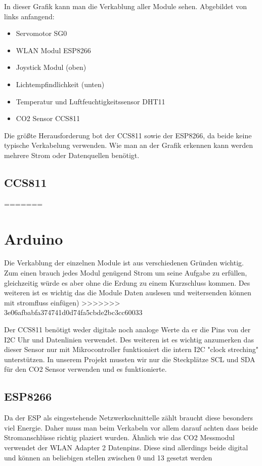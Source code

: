 In dieser Grafik kann man die Verkablung aller Module sehen. Abgebildet von links anfangend:

\begin{itemize}
	\item Servomotor SG0
	\item WLAN Modul ESP8266
	\item Joystick Modul (oben)
	\item Lichtempfindlichkeit (unten)
	\item Temperatur und Luftfeuchtigkeitssensor DHT11
	\item CO2 Sensor CCS811
\end{itemize}

Die größte Herausforderung bot der CCS811 sowie der ESP8266, da beide keine typische Verkabelung verwenden. Wie man an der Grafik erkennen kann werden mehrere Strom oder Datenquellen benötigt.

\subsection{CCS811}
=======
\section{Arduino}
Die Verkablung der einzelnen Module ist aus verschiedenen Gründen wichtig. Zum einen brauch jedes Modul genügend Strom um seine Aufgabe zu erfüllen, gleichzeitig würde es aber ohne die Erdung zu einem Kurzschluss kommen. Des weiteren ist es wichtig das die Module Daten auslesen und weitersenden können
 mit stromfluss einfügen)
>>>>>>> 3e06afbabfa374741d0d74fa5cbde2bc3cc60033

Der CCS811 benötigt weder digitale noch analoge Werte da er die Pins von der I2C Uhr und Datenlinien verwendet. Des weiteren ist es wichtig anzumerken das dieser Sensor nur mit Mikrocontroller funktioniert die intern I2C "clock streching" unterstützen. In unserem Projekt mussten wir nur die Steckplätze SCL und SDA für den CO2 Sensor verwenden und es funktionierte.

\subsection{ESP8266}

Da der ESP als eingestehende Netzwerkschnittelle zählt braucht diese besonders viel Energie. Daher muss man beim Verkabeln vor allem darauf achten dass beide Stromanschlüsse richtig plaziert wurden. Ähnlich wie das CO2 Messmodul verwendet der WLAN Adapter 2 Datenpins. Diese sind allerdings beide digital und können an beliebigen stellen zwischen 0 und 13 gesetzt werden


